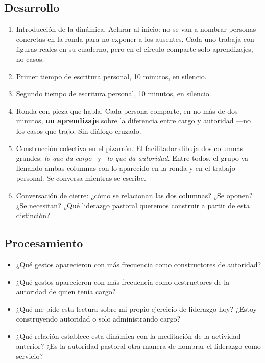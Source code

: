 \documentclass[11pt, a4paper]{article}
\begin{document}
\begin{actividad}
\subsection*{Desarrollo}
\begin{enumerate}[label={\arabic*.}]
  \item Introducción de la dinámica. Aclarar al inicio: no se van a nombrar personas concretas en la ronda para no exponer a los ausentes. Cada uno trabaja con figuras reales en su cuaderno, pero en el círculo comparte solo aprendizajes, no casos.
  \item Primer tiempo de escritura personal, 10 minutos, en silencio.
  \item Segundo tiempo de escritura personal, 10 minutos, en silencio.
  \item Ronda con pieza que habla. Cada persona comparte, en no más de dos minutos, \textbf{un aprendizaje} sobre la diferencia entre cargo y autoridad ---no los casos que trajo. Sin diálogo cruzado.
  \item Construcción colectiva en el pizarrón. El facilitador dibuja dos columnas grandes: \emph{lo que da cargo} \ y \  \emph{lo que da autoridad}. Entre todos, el grupo va llenando ambas columnas con lo aparecido en la ronda y en el trabajo personal. Se conversa mientras se escribe.
  \item Conversación de cierre: ¿cómo se relacionan las dos columnas? ¿Se oponen? ¿Se necesitan? ¿Qué liderazgo pastoral queremos construir a partir de esta distinción?
\end{enumerate}

\subsection*{Procesamiento}
\begin{itemize}
  \item ¿Qué gestos aparecieron con más frecuencia como constructores de autoridad?
  \item ¿Qué gestos aparecieron con más frecuencia como destructores de la autoridad de quien tenía cargo?
  \item ¿Qué me pide esta lectura sobre mi propio ejercicio de liderazgo hoy? ¿Estoy construyendo autoridad o solo administrando cargo?
  \item ¿Qué relación establece esta dinámica con la meditación de la actividad anterior? ¿Es la autoridad pastoral otra manera de nombrar el liderazgo como servicio?
\end{itemize}


\end{actividad}
\end{document}
